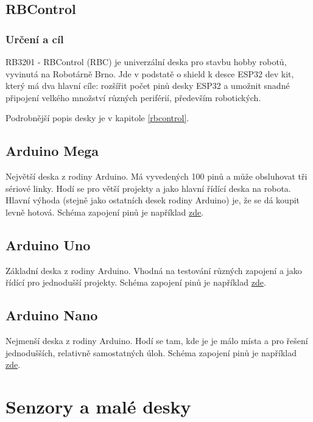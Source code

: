 \subsection{RBControl} 

\subsubsection*{Určení a cíl}

RB3201 - RBControl (RBC) je univerzální deska pro stavbu hobby robotů, vyvinutá na Robotárně Brno. 
Jde v podstatě o shield k desce ESP32 dev kit, který má dva hlavní cíle: 
rozšířit počet pinů desky ESP32 a umožnit snadné připojení velkého množství různých periférií, především robotických. 

Podrobnější popis desky je v kapitole \ref{rbcontrol}.

\subsection{Arduino Mega}

Největší deska z rodiny Arduino. Má vyvedených 100 pinů a může obsluhovat tři sériové linky. 
Hodí se pro větší projekty a jako hlavní řídící deska na robota. 
Hlavní výhoda (stejně jako ostatních desek rodiny Arduino) je, že se dá koupit levně hotová.
Schéma zapojení pinů je například \href{https://arduino-info.wikispaces.com/MegaQuickRef}{zde}.

\subsection{Arduino Uno}

Základní deska z rodiny Arduino. Vhodná na testování různých zapojení a jako řídící pro jednodušší projekty.
Schéma zapojení pinů je například \href{http://forum.arduino.cc/index.php?topic=146315.0}{zde}.

\subsection{Arduino Nano}

Nejmenší deska z rodiny Arduino. 
Hodí se tam, kde je je málo místa a pro řešení jednodušších, relativně samostatných úloh. 
Schéma zapojení pinů je například \href{https://simba-os.readthedocs.io/en/latest/_images/arduino-nano-pinout.png}{zde}.

\section{Senzory a malé desky}

